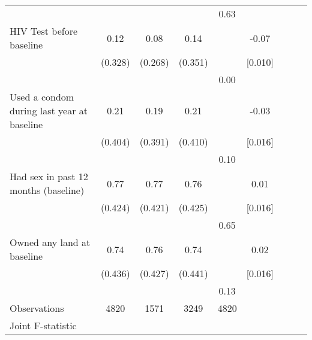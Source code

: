 \begin{table}[htbp]
\begin{tabular}{l*{4}{cc}}
                &         &         &         &     0.63&                  \\
HIV Test before baseline&     0.12&     0.08&     0.14&         &    -0.07\sym{***}\\
                &  (0.328)&  (0.268)&  (0.351)&         &  [0.010]         \\
                &         &         &         &     0.00&                  \\
Used a condom during last year at baseline&     0.21&     0.19&     0.21&         &    -0.03         \\
                &  (0.404)&  (0.391)&  (0.410)&         &  [0.016]         \\
                &         &         &         &     0.10&                  \\
Had sex in past 12 months (baseline)&     0.77&     0.77&     0.76&         &     0.01         \\
                &  (0.424)&  (0.421)&  (0.425)&         &  [0.016]         \\
                &         &         &         &     0.65&                  \\
Owned any land at baseline&     0.74&     0.76&     0.74&         &     0.02         \\
                &  (0.436)&  (0.427)&  (0.441)&         &  [0.016]         \\
                &         &         &         &     0.13&                  \\
\hline
Observations    &     4820&     1571&     3249&     4820&                  \\
Joint F-statistic&         &         &         &         &                  \\
\hline\hline
\end{tabular}
\end{table}
